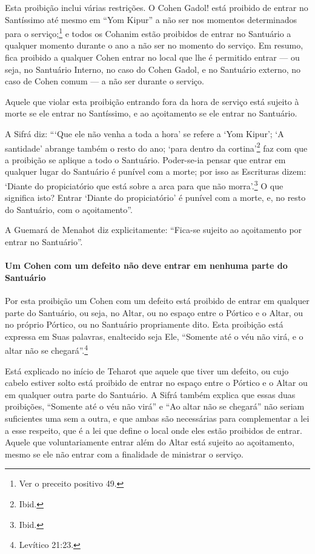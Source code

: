 Esta proibição inclui várias restrições. O Cohen Gadol! está
proibido de entrar no Santíssimo até mesmo em ``Yom Kipur'' a não ser
nos momentos determinados para o serviço;\footnote{Ver o preceito positivo 49.} e todos
os Cohanim estão proibidos de entrar no Santuário a qualquer
momento durante o ano a não ser no momento do serviço. Em resumo, fica
proibido a qualquer Cohen entrar no local que lhe é permitido entrar
--- ou seja, no Santuário Interno, no caso do Cohen Gadol, e no
Santuário externo, no caso de Cohen comum --- a não ser durante o
serviço.

Aquele que violar esta proibição entrando fora da hora de serviço está
sujeito à morte se ele entrar no Santíssimo, e ao açoitamento se ele
entrar no Santuário.

A Sifrá diz: ```Que ele não venha a toda a hora' se refere a `Yom
Kipur'; `A santidade' abrange também o resto do ano; `para dentro da
cortina'\footnote{Ibid.} faz com que a proibição se aplique a todo o Santuário.
Poder-se-ia pensar que entrar em qualquer lugar do Santuário é punível
com a morte; por isso as Escrituras dizem: `Diante do propiciatório que
está sobre a arca para que não morra'.\footnote{Ibid.} O que significa isto?
Entrar `Diante do propiciatório' é punível com a morte, e, no resto do
Santuário, com o açoitamento''.

A Guemará de Menahot diz explicitamente: ``Fica-se sujeito ao
açoitamento por entrar no Santuário''.

\paragraph{Um Cohen com um defeito não deve entrar em nenhuma parte do
Santuário}

Por esta proibição um Cohen com um defeito está proibido de entrar
em qualquer parte do Santuário, ou seja, no Altar, ou no espaço entre o
Pórtico e o Altar, ou no próprio Pórtico, ou no Santuário propriamente
dito. Esta proibição está expressa em Suas palavras, enaltecido seja
Ele, ``Somente até o véu não virá, e o altar não se chegará''.\footnote{Levítico
21:23.}

Está explicado no início de Teharot que aquele que tiver um defeito, ou
cujo cabelo estiver solto está proibido de entrar no espaço entre o
Pórtico e o Altar ou em qualquer outra parte do Santuário. A Sifrá
também explica que essas duas proibições, ``Somente até o véu não virá''
e ``Ao altar não se chegará'' não seriam suficientes uma sem a outra, e
que ambas são necessárias para complementar a lei a esse respeito, que é
a lei que define o local onde eles estão proibidos de entrar. Aquele que
voluntariamente entrar além do Altar está sujeito ao açoitamento, mesmo
se ele não entrar com a finalidade de ministrar o serviço.

